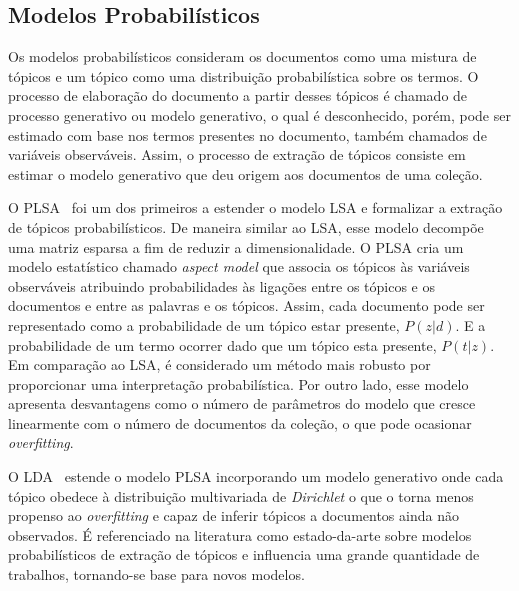 \subsection{Modelos Probabilísticos}

Os modelos probabilísticos consideram os documentos como uma mistura de tópicos e um tópico como uma distribuição probabilística sobre os termos. O processo de elaboração do documento a partir desses tópicos é chamado de processo generativo ou modelo generativo, o qual é desconhecido, porém, pode ser estimado com base nos termos presentes no documento, também chamados de variáveis observáveis. Assim, o processo de extração de tópicos consiste em estimar o modelo generativo que deu origem aos documentos de uma coleção.
 
O PLSA~\cite{Hofmann1999} foi um dos primeiros a estender o modelo LSA e formalizar a extração de tópicos probabilísticos. De maneira similar ao LSA, esse modelo decompõe uma matriz esparsa a fim de reduzir a dimensionalidade. O PLSA cria um modelo estatístico chamado \textit{aspect model} que associa os tópicos às variáveis observáveis atribuindo probabilidades às ligações entre os tópicos e os documentos e entre as palavras e os tópicos. Assim, cada documento pode ser representado como a probabilidade de um tópico estar presente, $P(z|d)$. E a probabilidade de um termo ocorrer dado que um tópico esta presente, $P(t|z)$. Em comparação ao LSA, é considerado um método mais robusto por proporcionar uma interpretação probabilística. Por outro lado, esse modelo apresenta desvantagens como o número de parâmetros do modelo que cresce linearmente com o número de documentos da coleção, o que pode ocasionar \textit{overfitting}.   %

O LDA~\cite{Blei2003} estende o modelo PLSA incorporando um modelo generativo onde  cada tópico obedece à distribuição multivariada de \textit{Dirichlet} o que o torna menos propenso ao \textit{overfitting} e capaz de inferir tópicos a documentos ainda não observados. É referenciado na literatura como estado-da-arte sobre modelos probabilísticos de extração de tópicos e influencia uma grande quantidade de trabalhos, tornando-se base para novos modelos. 











